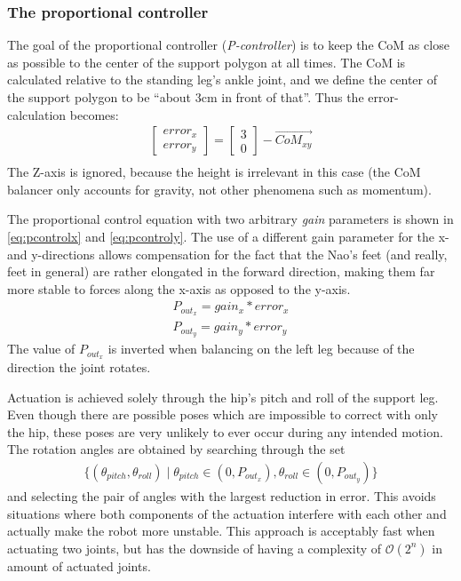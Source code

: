\documentclass[a4paper]{article}
\begin{document}
\subsubsection{The proportional controller}
The goal of the proportional controller (\emph{P-controller}) is to keep the
CoM as close as possible to the center of the support polygon at all times.
The CoM is calculated relative to the standing leg's ankle joint, and we define
the center of the support polygon to be ``about 3cm in front of that''. Thus the
error-calculation becomes:
\begin{align}
  \begin{bmatrix} error_x \\ error_y \end{bmatrix} = \begin{bmatrix} 3 \\ 0 \end{bmatrix} - \vec{CoM_{xy}} \\
\end{align}
The Z-axis is ignored, because the height is irrelevant in this case (the CoM
balancer only accounts for gravity, not other phenomena such as momentum).

The proportional control equation with two arbitrary \emph{gain} parameters is
shown in \ref{eq:pcontrolx} and \ref{eq:pcontroly}. The use of a different gain
parameter for the x- and y-directions allows compensation for the fact that the
Nao's feet (and really, feet in general) are rather elongated in the forward
direction, making them far more stable to forces along the x-axis as opposed to
the y-axis.
\begin{align}
  P_{out_{x}} = gain_x * error_x        \label{eq:pcontrolx} \\
  P_{out_{y}} = gain_y * error_y        \label{eq:pcontroly}
\end{align}
The value of $P_{out_{x}}$ is inverted when balancing on the left leg because of
the direction the joint rotates.

Actuation is achieved solely through the hip's pitch and roll of the support
leg. Even though there are possible poses which are impossible to correct with
only the hip, these poses are very unlikely to ever occur during any intended motion.
The rotation angles are obtained by searching through the set
\begin{align*}
  \{ (\theta_{pitch}, \theta_{roll}) \mid \theta_{pitch} \in (0, P_{out_{x}}),
  \theta_{roll} \in (0, P_{out_{y}}) \}
\end{align*}
and selecting the pair of angles with the largest reduction in error. This
avoids situations where both components of the actuation interfere with
each other and actually make the robot more unstable. This approach is acceptably
fast when actuating two joints, but has the downside of having a complexity of
$\mathcal{O}(2^n)$ in amount of actuated joints.
\end{document}
